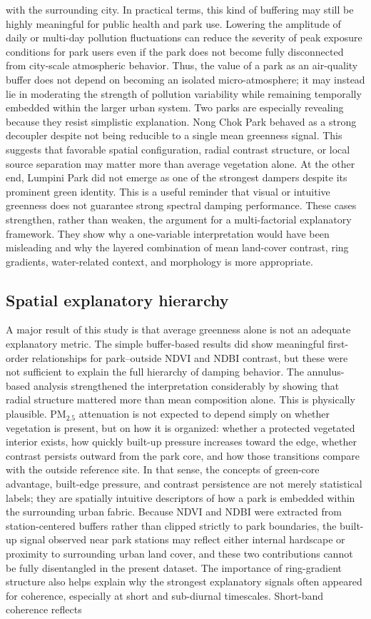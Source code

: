 with the surrounding city. In practical terms, this kind of buffering may still be highly meaningful for public health and park use. Lowering the amplitude of daily or multi-day pollution fluctuations can reduce the severity of peak exposure conditions for park users even if the park does not become fully disconnected from city-scale atmospheric behavior. Thus, the value of a park as an air-quality buffer does not depend on becoming an isolated micro-atmosphere; it may instead lie in moderating the strength of pollution variability while remaining temporally embedded within the larger urban system. Two parks are especially revealing because they resist simplistic explanation. Nong Chok Park behaved as a strong decoupler despite not being reducible to a single mean greenness signal. This suggests that favorable spatial configuration, radial contrast structure, or local source separation may matter more than average vegetation alone. At the other end, Lumpini Park did not emerge as one of the strongest dampers despite its prominent green identity. This is a useful reminder that visual or intuitive greenness does not guarantee strong spectral damping performance. These cases strengthen, rather than weaken, the argument for a multi-factorial explanatory framework. They show why a one-variable interpretation would have been misleading and why the layered combination of mean land-cover contrast, ring gradients, water-related context, and morphology is more appropriate. \subsection{Spatial explanatory hierarchy} A major result of this study is that average greenness alone is not an adequate explanatory metric. The simple buffer-based results did show meaningful first-order relationships for park--outside NDVI and NDBI contrast, but these were not sufficient to explain the full hierarchy of damping behavior. The annulus-based analysis strengthened the interpretation considerably by showing that radial structure mattered more than mean composition alone. This is physically plausible. PM$_{2.5}$ attenuation is not expected to depend simply on whether vegetation is present, but on how it is organized: whether a protected vegetated interior exists, how quickly built-up pressure increases toward the edge, whether contrast persists outward from the park core, and how those transitions compare with the outside reference site. In that sense, the concepts of green-core advantage, built-edge pressure, and contrast persistence are not merely statistical labels; they are spatially intuitive descriptors of how a park is embedded within the surrounding urban fabric. Because NDVI and NDBI were extracted from station-centered buffers rather than clipped strictly to park boundaries, the built-up signal observed near park stations may reflect either internal hardscape or proximity to surrounding urban land cover, and these two contributions cannot be fully disentangled in the present dataset. The importance of ring-gradient structure also helps explain why the strongest explanatory signals often appeared for coherence, especially at short and sub-diurnal timescales. Short-band coherence reflects 
